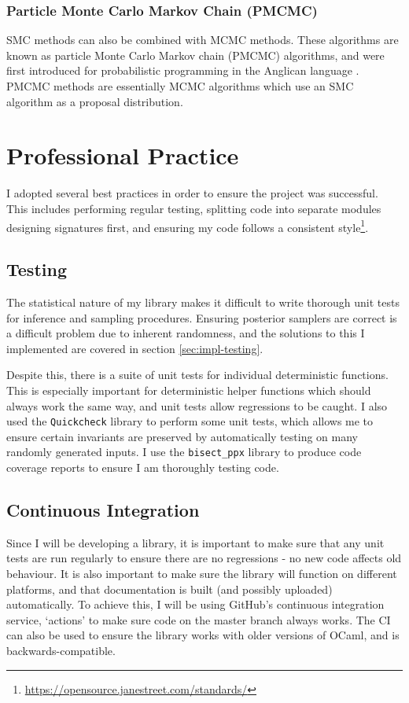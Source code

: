 \subsubsection{Particle Monte Carlo Markov Chain (PMCMC)}
SMC methods can also be combined with MCMC methods. These algorithms are known as particle Monte Carlo Markov chain (PMCMC) algorithms, and were first introduced for probabilistic programming in the Anglican language \cite{anglican-smc}. PMCMC methods are essentially MCMC algorithms which use an SMC algorithm as a proposal distribution.
	
\section{Professional Practice}
			
I adopted several best practices in order to ensure the project was successful. This includes performing regular testing, splitting code into separate modules designing signatures first, and ensuring my code follows a consistent style\footnote{\url{https://opensource.janestreet.com/standards/}}.
			
\subsection{Testing} \label{sec:prep-testing}
The statistical nature of my library makes it difficult to write thorough unit tests for inference and sampling procedures. Ensuring posterior samplers are correct is a difficult problem due to inherent randomness, and the solutions to this I implemented are covered in section \ref{sec:impl-testing}.
	
Despite this, there is a suite of unit tests for individual deterministic functions. This is especially important for deterministic helper functions which should always work the same way, and unit tests allow regressions to be caught. I also used the \texttt{Quickcheck} library to perform some unit tests, which allows me to ensure certain invariants are preserved by automatically testing on many randomly generated inputs. I use the \texttt{bisect\_ppx} library to produce code coverage reports to ensure I am thoroughly testing code.
	
\subsection{Continuous Integration}
Since I will be developing a library, it is important to make sure that any unit tests are run regularly to ensure there are no regressions - no new code affects old behaviour. It is also important to make sure the library will function on different platforms, and that documentation is built (and possibly uploaded) automatically. To achieve this, I will be using GitHub's continuous integration service, `actions' to make sure code on the master branch always works. The CI can also be used to ensure the library works with older versions of OCaml, and is backwards-compatible.
			
